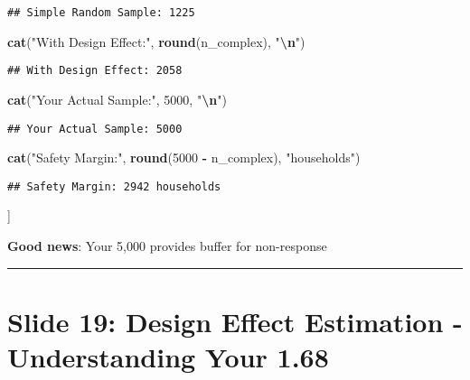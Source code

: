 \documentclass[
]{article}
\newenvironment{Shaded}{\begin{snugshade}}{\end{snugshade}}
\newcommand{\DecValTok}[1]{\textcolor[rgb]{0.00,0.00,0.81}{#1}}
\newcommand{\FunctionTok}[1]{\textcolor[rgb]{0.13,0.29,0.53}{\textbf{#1}}}
\newcommand{\NormalTok}[1]{#1}
\newcommand{\SpecialCharTok}[1]{\textcolor[rgb]{0.81,0.36,0.00}{\textbf{#1}}}
\newcommand{\StringTok}[1]{\textcolor[rgb]{0.31,0.60,0.02}{#1}}
\begin{document}
\begin{verbatim}
## Simple Random Sample: 1225
\end{verbatim}

\begin{Shaded}
\begin{Highlighting}[]
\FunctionTok{cat}\NormalTok{(}\StringTok{"With Design Effect:"}\NormalTok{, }\FunctionTok{round}\NormalTok{(n\_complex), }\StringTok{"}\SpecialCharTok{\textbackslash{}n}\StringTok{"}\NormalTok{)}
\end{Highlighting}
\end{Shaded}

\begin{verbatim}
## With Design Effect: 2058
\end{verbatim}

\begin{Shaded}
\begin{Highlighting}[]
\FunctionTok{cat}\NormalTok{(}\StringTok{"Your Actual Sample:"}\NormalTok{, }\DecValTok{5000}\NormalTok{, }\StringTok{"}\SpecialCharTok{\textbackslash{}n}\StringTok{"}\NormalTok{)}
\end{Highlighting}
\end{Shaded}

\begin{verbatim}
## Your Actual Sample: 5000
\end{verbatim}

\begin{Shaded}
\begin{Highlighting}[]
\FunctionTok{cat}\NormalTok{(}\StringTok{"Safety Margin:"}\NormalTok{, }\FunctionTok{round}\NormalTok{(}\DecValTok{5000} \SpecialCharTok{{-}}\NormalTok{ n\_complex), }\StringTok{"households"}\NormalTok{)}
\end{Highlighting}
\end{Shaded}

\begin{verbatim}
## Safety Margin: 2942 households
\end{verbatim}

{]}

\textbf{Good news}: Your 5,000 provides buffer for non-response

\begin{center}\rule{0.5\linewidth}{0.5pt}\end{center}

\section{Slide 19: Design Effect Estimation - Understanding Your
1.68}\label{slide-19-design-effect-estimation---understanding-your-1.68}
\end{document}
